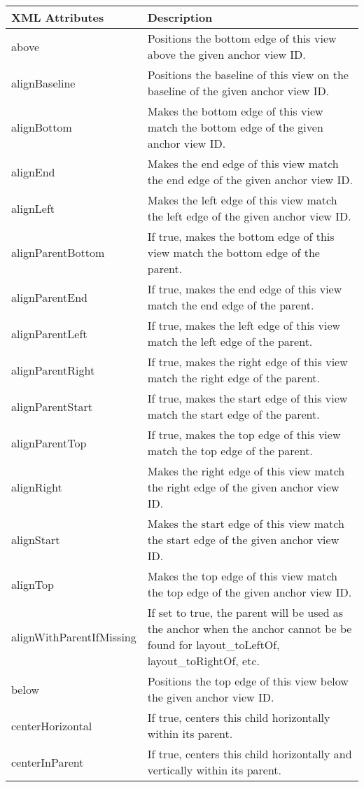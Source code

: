 ﻿\documentclass[a4paper]{article}
\newenvironment{layoutparams}[1]{ %
  \begin{table*}[hptb]
  \ttfamily\centering
  \caption{#1}
  \vspace{1ex}
  \rowcolors{2}{green!20!red!20}{yellow!20}
  \begin{tabular}{p{14.5em}p{28em}}
    \rowcolor{cyan!60}
    XML Attributes & Description \\ %
    \hline
}{
  \end{tabular}
  \end{table*}
}
\begin{document}
  \begin{layoutparams}{RelativeLayout.LayoutParams}
    above	&	Positions the bottom edge of this view above the given anchor view ID.\\
    alignBaseline	&	Positions the baseline of this view on the baseline of the given anchor view ID.\\
    alignBottom	&	Makes the bottom edge of this view match the bottom edge of the given anchor view ID.\\
    alignEnd	&	Makes the end edge of this view match the end edge of the given anchor view ID.\\
    alignLeft	&	Makes the left edge of this view match the left edge of the given anchor view ID.\\
    alignParentBottom	&	If true, makes the bottom edge of this view match the bottom edge of the parent.\\
    alignParentEnd	&	If true, makes the end edge of this view match the end edge of the parent.\\
    alignParentLeft	&	If true, makes the left edge of this view match the left edge of the parent.\\
    alignParentRight	&	If true, makes the right edge of this view match the right edge of the parent.\\
    alignParentStart	&	If true, makes the start edge of this view match the start edge of the parent.\\
    alignParentTop	&	If true, makes the top edge of this view match the top edge of the parent.\\
    alignRight	&	Makes the right edge of this view match the right edge of the given anchor view ID.\\
    alignStart	&	Makes the start edge of this view match the start edge of the given anchor view ID.\\
    alignTop	&	Makes the top edge of this view match the top edge of the given anchor view ID.\\
    alignWithParentIfMissing	&	If set to true, the parent will be used as the anchor when the anchor cannot be be found for layout\_toLeftOf, layout\_toRightOf, etc.\\
    below	&	Positions the top edge of this view below the given anchor view ID.\\
    centerHorizontal	&	If true, centers this child horizontally within its parent.\\
    centerInParent	&	If true, centers this child horizontally and vertically within its parent.\\

\end{layoutparams}
\end{document}
